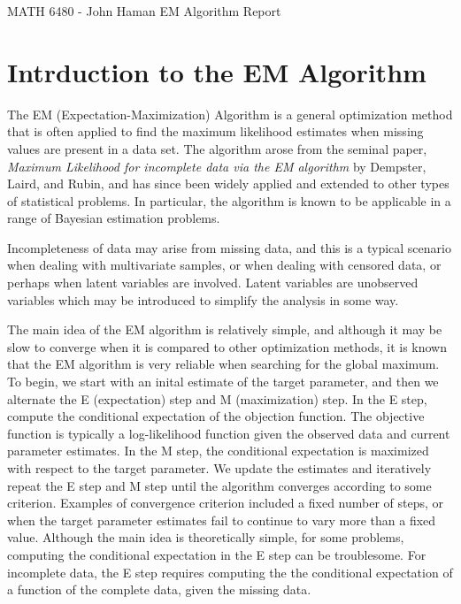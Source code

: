 \documentclass[12pt]{article}
\newcommand{\CourseName}{\textsf{MATH 6480 - John Haman }}
\begin{document}
\medskip
\begin{flushleft}
  \CourseName \hfill \textsf{EM Algorithm Report}\\
\medskip

\section{Intrduction to the EM Algorithm}

\par

The EM (Expectation-Maximization) Algorithm is a general optimization method that is often applied to find the maximum likelihood estimates when missing values are present in a data set. The algorithm arose from the seminal paper, \textit{Maximum Likelihood for incomplete data via the EM algorithm} by Dempster, Laird, and Rubin, and has since been widely applied and extended to other types of statistical problems. In particular, the algorithm is known to be applicable in a range of Bayesian estimation problems. 

\medskip

\par

Incompleteness of data may arise from missing data, and this is a typical scenario when dealing with multivariate samples, or when dealing with censored data, or perhaps when latent variables are involved. Latent variables are unobserved variables which may be introduced to simplify the analysis in some way. \\

\medskip

\par

The main idea of the EM algorithm is relatively simple, and although it may be slow to converge when it is compared to other optimization methods, it is known that the EM algorithm is very reliable when searching for the global maximum. To begin, we start with an inital estimate of the target parameter, and then we alternate the E (expectation) step and M (maximization) step. In the E step, compute the conditional expectation of the objection function. The objective function is typically a log-likelihood function given the observed data and current parameter estimates. In the M step, the conditional expectation is maximized with respect to the target parameter. We update the estimates and iteratively repeat the E step and M step until the algorithm converges according to some criterion. Examples of convergence criterion included a fixed number of steps, or when the target parameter estimates fail to continue to vary more than a fixed value. Although the main idea is theoretically simple, for some problems, computing the conditional expectation in the E step can be troublesome. For incomplete data, the E step requires computing the the conditional expectation of a function of the complete data, given the missing data. 


\end{flushleft}
\end{document}
